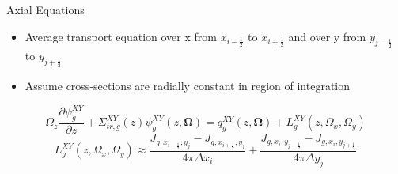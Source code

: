 \begin{frame}[t]{Axial Equations}

\begin{itemize}
  \item Average transport equation over x from $x_{i-\frac{1}{2}}$ to 
  $x_{i+\frac{1}{2}}$ and over y from $y_{j-\frac{1}{2}}$ to $y_{j+\frac{1}{2}}$
  \item Assume cross-sections are radially constant in region of integration
\end{itemize}
\begin{dmath*}
{\Omega_z \frac{\partial \psi_{g}^{XY}}{\partial z}} + 
{\Sigma_{tr,g}^{XY}\left(z\right)\psi_{g}^{XY}\left(z,\bm\Omega\right)} = 
q_{g}^{XY}\left(z,\bm\Omega\right) + 
{L_{g}^{XY}\left(z,\Omega_x,\Omega_y\right)}
\end{dmath*}
\begin{equation*}
L_{g}^{XY}\left(z,\Omega_x,\Omega_y\right) \approx 
{\frac{J_{g,x_{i-\frac{1}{2}},y_j} - 
  J_{g,x_{i+\frac{1}{2}},y_j}}{4\pi\Delta x_i}} +
\frac{J_{g,x_i,y_{j-\frac{1}{2}}} - J_{g,x_i,y_{j+\frac{1}{2}}}}{4\pi\Delta 
y_j}
\end{equation*}

\end{frame}


